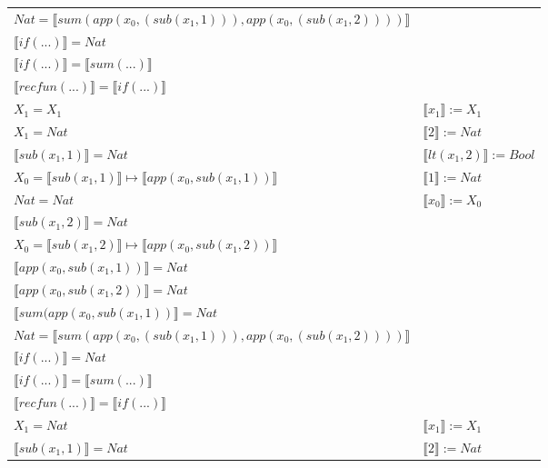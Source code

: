 \begin{exercise}
\begin{description}
\begin{center}
\begin{longtable}[!h]{ | l | l | }
                        $Nat =  \llbracket sum(app(x_0, (sub(x_1,1))), app(x_0, (sub(x_1,2)))) \rrbracket$ & \\
                        $ \llbracket if(...) \rrbracket = Nat$ & \\
                        $ \llbracket if(...) \rrbracket =  \llbracket sum(...) \rrbracket$ & \\
                        $ \llbracket recfun(...) \rrbracket =   \llbracket if(...) \rrbracket$ & \\
                    \hline
                        $X_1 = X_1$ & $ \llbracket x_1 \rrbracket := X_1$ \\
                        $X_1 = Nat$ & $ \llbracket 2 \rrbracket := Nat$ \\
                        $ \llbracket sub(x_1,1) \rrbracket = Nat$ & $ \llbracket lt(x_1 , 2) \rrbracket := Bool$  \\
                        $X_0 =  \llbracket sub(x_1,1) \rrbracket \mapsto  \llbracket app(x_0, sub(x_1,1)) \rrbracket$ &  $ \llbracket 1 \rrbracket := Nat$\\
                        $Nat = Nat$ & $ \llbracket x_0 \rrbracket := X_0$ \\
                        $ \llbracket sub(x_1,2) \rrbracket = Nat$ & \\
                        $X_0 =  \llbracket sub(x_1,2) \rrbracket \mapsto  \llbracket app(x_0, sub(x_1,2)) \rrbracket$ & \\
                        $ \llbracket app(x_0, sub(x_1,1)) \rrbracket = Nat$ & \\
                        $ \llbracket app(x_0, sub(x_1,2)) \rrbracket = Nat$ & \\
                        $ \llbracket sum(app(x_0, sub(x_1,1)) \rrbracket = Nat$ & \\
                        $Nat =  \llbracket sum(app(x_0, (sub(x_1,1))), app(x_0, (sub(x_1,2)))) \rrbracket$ & \\
                        $ \llbracket if(...) \rrbracket = Nat$ & \\
                        $ \llbracket if(...) \rrbracket =  \llbracket sum(...) \rrbracket$ & \\
                        $ \llbracket recfun(...) \rrbracket =   \llbracket if(...) \rrbracket$ & \\
                    \hline
                        $X_1 = Nat$ &  $ \llbracket x_1 \rrbracket := X_1$ \\
                        $ \llbracket sub(x_1,1) \rrbracket = Nat$ & $ \llbracket 2 \rrbracket := Nat$ \\

\end{longtable}
\end{center}
\end{description}
\end{exercise}
